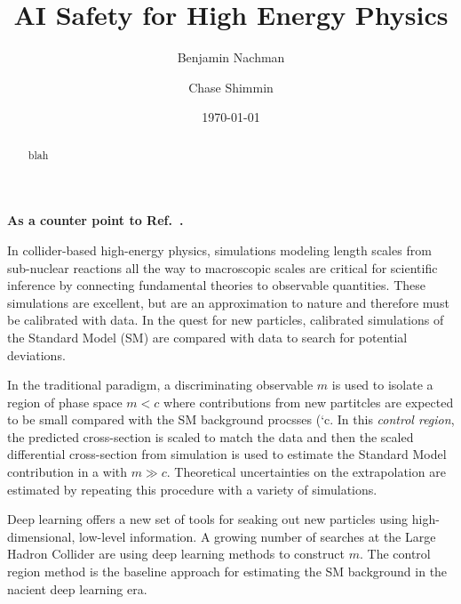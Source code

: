 \documentclass[reprint,nofootinbib,...]{revtex4-1}
\begin{document}
\title{AI Safety for High Energy Physics}

\author{Benjamin Nachman}


\author{Chase Shimmin}


\begin{abstract}
blah
\end{abstract}

\date{\today}
\maketitle


\textbf{As a counter point to Ref.~\cite{Baldi:2014kfa}.}

In collider-based high-energy physics, simulations modeling length scales from sub-nuclear reactions all the way to macroscopic scales are critical for scientific inference by connecting fundamental theories to observable quantities.  These simulations are excellent, but are an approximation to nature and therefore must be calibrated with data. In the quest for new particles, calibrated simulations of the Standard Model (SM) are compared with data to search for potential deviations.

In the traditional paradigm, a discriminating observable $m$ is used to isolate a region of phase space $m<c$ where contributions from new partitcles are expected to be small compared with the SM background procsses (`c.  In this \textit{control region}, the predicted cross-section is scaled to match the data and then the scaled differential cross-section from simulation is used to estimate the Standard Model contribution in a  with $m\gg c$.  Theoretical uncertainties on the extrapolation are estimated by repeating this procedure with a variety of simulations.

Deep learning offers a new set of tools for seaking out new particles using high-dimensional, low-level information. A growing number of searches at the Large Hadron Collider are using deep learning methods to construct $m$. The control region method is the baseline approach for estimating the SM background in the nacient deep learning era.
\end{document}
